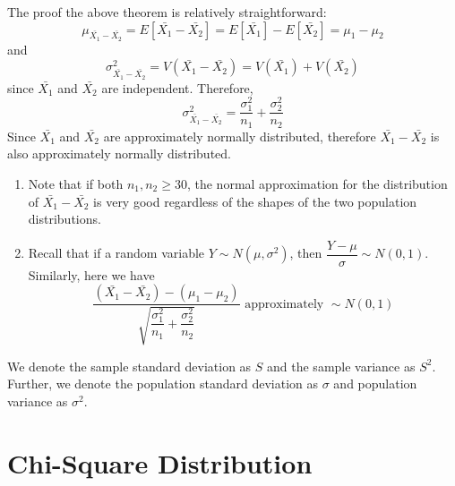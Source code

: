 The proof the above theorem is relatively straightforward:
$$
\mu_{\bar{X_1} - \bar{X_2}} = E[\bar{X_1} - \bar{X_2}] = E[\bar{X_1}] - E[\bar{X_2}] = \mu_1 - \mu_2
$$
and 
$$
\sigma_{\bar{X_1} - \bar{X_2}}^2 = V(\bar{X_1} - \bar{X_2}) = V(\bar{X_1}) + V(\bar{X_2})
$$
since $\bar{X_1}$ and $\bar{X_2}$ are independent. Therefore, 
$$
\sigma_{\bar{X_1} - \bar{X_2}}^2 = \dfrac{\sigma_1^2}{n_1} + \dfrac{\sigma_2^2}{n_2}
$$
Since $\bar{X_1}$ and $\bar{X_2}$ are approximately normally distributed, therefore $\bar{X_1} - \bar{X_2}$ is also approximately normally distributed.
\begin{note}
\end{note}

\begin{enumerate}
    \item Note that if both $n_1, n_2 \geq 30$, the normal approximation for the distribution of $\bar{X_1} - \bar{X_2}$ is very good regardless of the shapes of the two population distributions.
    \item Recall that if a random variable $Y \sim N(\mu, \sigma^2)$, then $\dfrac{Y - \mu}{\sigma} \sim N(0,1)$. Similarly, here we have
    $$
    \dfrac{(\bar{X_1} - \bar{X_2}) - (\mu_1 - \mu_2)}{\sqrt{\dfrac{\sigma_1^2}{n_1} + \dfrac{\sigma_2^2}{n_2}}} \text{ approximately } \sim N(0,1) 
    $$
\end{enumerate}
We denote the sample standard deviation as $S$ and the sample variance as $S^2$. Further, we denote the population standard deviation as $\sigma$ and population variance as $\sigma^2$.

\section{Chi-Square Distribution}

